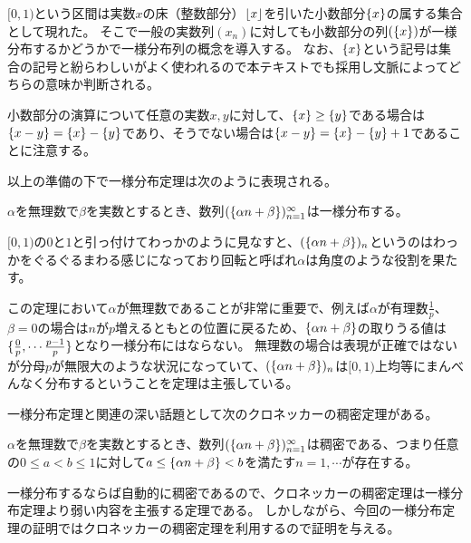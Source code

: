 $[0, 1)$という区間は実数$x$の床（整数部分）$\lfloor x\rfloor$を引いた小数部分$\{x\}$の属する集合として現れた。
そこで一般の実数列$(x_n)$に対しても小数部分の列$(\{x\})$が一様分布するかどうかで一様分布列の概念を導入する。
なお、$\{x\}$という記号は集合の記号と紛らわしいがよく使われるので本テキストでも採用し文脈によってどちらの意味か判断される。

\begin{remark}
小数部分の演算について任意の実数$x, y$に対して、$\{x\} \ge \{y\}$である場合は$\{x-y\} = \{x\}-\{y\}$であり、そうでない場合は$\{x-y\} = \{x\}-\{y\}+1$であることに注意する。
\end{remark}

以上の準備の下で一様分布定理は次のように表現される。

\begin{theorem}[一様分布定理]
$\alpha$を無理数で$\beta$を実数とするとき、数列$(\{\alpha n+\beta\})_{n = 1}^\infty$は一様分布する。
\end{theorem}

$[0, 1)$の$0$と$1$と引っ付けてわっかのように見なすと、$(\{\alpha n+\beta\})_n$というのはわっかをぐるぐるまわる感じになっており回転と呼ばれ$\alpha$は角度のような役割を果たす。

この定理において$\alpha$が無理数であることが非常に重要で、例えば$\alpha$が有理数$\frac{1}{p}$、$\beta = 0$の場合は$n$が$p$増えるともとの位置に戻るため、$\{\alpha n+\beta\}$の取りうる値は$\{ \frac{0}{p}, \cdots \frac{p-1}{p} \}$となり一様分布にはならない。
無理数の場合は表現が正確ではないが分母$p$が無限大のような状況になっていて、$(\{\alpha n+\beta\})_n$は$[0, 1)$上均等にまんべんなく分布するということを定理は主張している。

一様分布定理と関連の深い話題として次のクロネッカーの稠密定理がある。

\begin{theorem}[クロネッカーの稠密定理]
$\alpha$を無理数で$\beta$を実数とするとき、数列$(\{\alpha n+\beta\})_{n = 1}^\infty$は稠密である、つまり任意の$0 \le a < b \le 1$に対して$a \le \{\alpha n+\beta\} < b$を満たす$n = 1, \cdots$が存在する。
\end{theorem}

一様分布するならば自動的に稠密であるので、クロネッカーの稠密定理は一様分布定理より弱い内容を主張する定理である。
しかしながら、今回の一様分布定理の証明ではクロネッカーの稠密定理を利用するので証明を与える。

